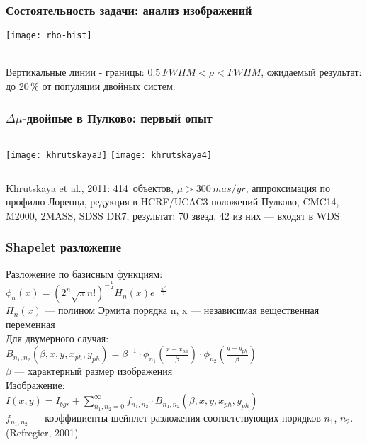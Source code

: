 \begin{frame}%
\frametitle{Состоятельность задачи: {\small анализ изображений}}
\begin{center}
\texttt{[image: rho-hist]}
\end{center}
\begin{center}
{\footnotesize \\ Вертикальные линии - границы: $0.5\,FWHM<\rho<FWHM$, ожидаемый результат: до 20\,\% от популяции двойных систем.}
\end{center}
\end{frame}

\begin{frame}%
\frametitle{$\Delta\mu$-двойные в Пулково: {\small первый опыт}}
\begin{columns}
	\texttt{[image: khrutskaya3]}
	\texttt{[image: khrutskaya4]}
\end{columns}
\begin{center}
{\scriptsize Khrutskaya et al., 2011: 414~объектов, $\mu > 300\,mas/yr$,  аппроксимация по профилю Лоренца, редукция в HCRF/UCAC3 положений Пулково, CMC14, M2000, 2MASS, SDSS DR7, результат: 70 звезд, 42 из них --- входят в WDS}
\end{center}
\end{frame}

\begin{frame}
\frametitle{Shapelet разложение}
{\footnotesize Разложение по базисным функциям:}\\
{\footnotesize $\phi_n(x) = \left(2^n\sqrt{\pi}n!\right)^{-\frac{1}{2}}H_n(x)e^{-\frac{x^2}{2}}$}\\
{\tiny $H_n(x)$ --- полином Эрмита порядка n, x --- независимая вещественная переменная}\\[10pt]
{\footnotesize Для двумерного случая:}\\
{\footnotesize $B_{n_1,n_2}(\beta,x,y,x_{ph},y_{ph}) = \beta^{-1}\cdot\phi_{n_1}\left(\frac{x-x_{ph}}{\beta}\right)\cdot\phi_{n_2}\left(\frac{y-y_{ph}}{\beta}\right)$}\\
{\tiny $\beta$ --- характерный размер изображения}\\[10pt]
{\footnotesize Изображение:}\\
{\footnotesize $I(x,y) = I_{bgr}+\sum_{n_1,n_2=0}^{\infty}f_{n_1,n_2}\cdot B_{n_1,n_2}(\beta,x,y,x_{ph},y_{ph})$}\\
{\tiny $f_{n_1,n_2}$ --- коэффициенты шейплет-разложения соответствующих порядков $n_1$, $n_2$.}\\[15pt]
{\footnotesize (Refregier, 2001)}
\end{frame}


